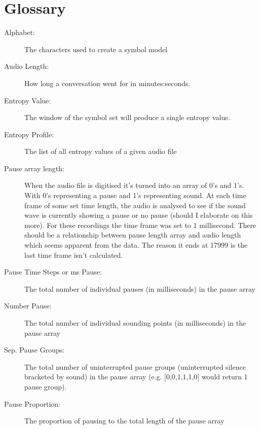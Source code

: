 \chapter{Glossary}
\begin{description}
	

	
	\item[Alphabet:] The characters used to create a symbol model 


	
	\item[Audio Length:] How long a conversation went for in minutes:seconds. 
	
	
	\item[Entropy Value:] The window of the symbol set will produce a single entropy value.
	
	\item[Entropy Profile:] The list of all entropy values of a given audio file
	


	\item[Pause array length:] When the audio file is digitised it's turned into an array of 
	0's and 1's. With 0's representing a pause and 1's representing sound. At each time frame of 
	some set time length, the audio is analysed to see if the sound wave is currently showing a 
	pause or no pause (should I elaborate on this more). For these recordings the time frame was 
	set to 1 millisecond. There should be a relationship between pause length array and audio length 
	which seems apparent from the data. The reason it ends at 17999 is the last time frame isn't calculated. 
	
	\item[Pause Time Steps or ms Pause:] The total number of individual pauses (in milliseconds) in the pause array 

	\item[Number Pause:] The total number of individual sounding points (in milliseconds) in the pause array 
	
	\item[Sep. Pause Groups:] The total number of uninterrupted pause groups 
	(uninterrupted silence bracketed by sound) in the pause array (e.g. [0,0,1,1,1,0] would return 1 pause group).
	
	\item[Pause Proportion:] The proportion of pausing to the total length of the pause array
	

\end{description}
